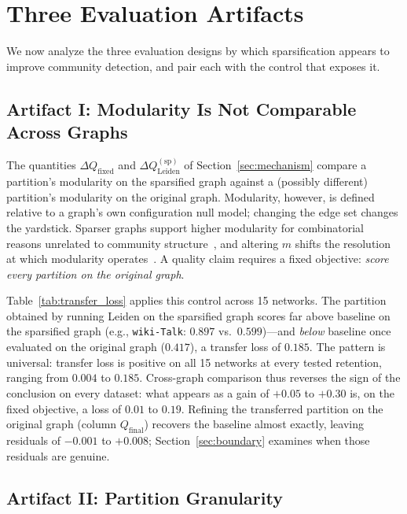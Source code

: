 \section{Three Evaluation Artifacts}
\label{sec:artifacts}

We now analyze the three evaluation designs by which sparsification appears to improve community detection, and pair each with the control that exposes it.

\subsection{Artifact I: Modularity Is Not Comparable Across Graphs}
\label{sec:artifact-modularity}

The quantities $\Delta Q_{\mathrm{fixed}}$ and $\Delta Q_{\mathrm{Leiden}}^{\mathrm{(sp)}}$ of Section~\ref{sec:mechanism} compare a partition's modularity on the sparsified graph against a (possibly different) partition's modularity on the original graph.
Modularity, however, is defined relative to a graph's own configuration null model; changing the edge set changes the yardstick.
Sparser graphs support higher modularity for combinatorial reasons unrelated to community structure~\cite{guimera2004modularity}, and altering $m$ shifts the resolution at which modularity operates~\cite{fortunato2007resolution}.
A quality claim requires a fixed objective: \emph{score every partition on the original graph}.



Table~\ref{tab:transfer_loss} applies this control across 15 networks.
The partition obtained by running Leiden on the sparsified graph scores far above baseline on the sparsified graph (e.g., \texttt{wiki-Talk}: $0.897$ vs.\ $0.599$)---and \emph{below} baseline once evaluated on the original graph ($0.417$), a transfer loss of $0.185$.
The pattern is universal: transfer loss is positive on all 15 networks at every tested retention, ranging from $0.004$ to $0.185$.
Cross-graph comparison thus reverses the sign of the conclusion on every dataset: what appears as a gain of $+0.05$ to $+0.30$ is, on the fixed objective, a loss of $0.01$ to $0.19$.
Refining the transferred partition on the original graph (column $Q_{\mathrm{final}}$) recovers the baseline almost exactly, leaving residuals of $-0.001$ to $+0.008$; Section~\ref{sec:boundary} examines when those residuals are genuine.

\subsection{Artifact II: Partition Granularity}
\label{sec:artifact-granularity}

